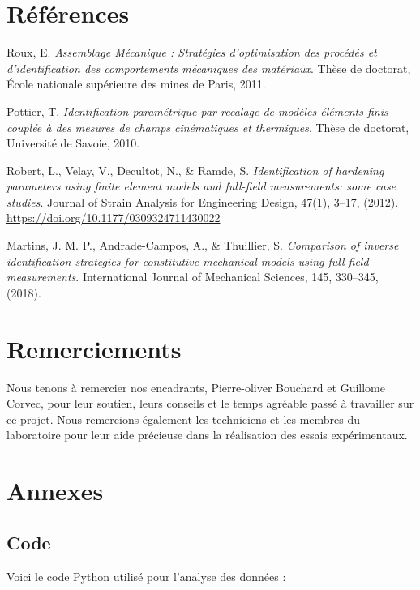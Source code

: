 \documentclass[12pt,a4paper]{article}
\begin{document}
\section{Références}
\begin{thebibliography}{9}

Roux, E. 
\textit{Assemblage Mécanique : Stratégies d’optimisation des procédés et d’identification des comportements mécaniques des matériaux}. 
Thèse de doctorat, École nationale supérieure des mines de Paris, 2011.

Pottier, T. 
\textit{Identification paramétrique par recalage de modèles éléments finis couplée à des mesures de champs cinématiques et thermiques}. 
Thèse de doctorat, Université de Savoie, 2010.

Robert, L., Velay, V., Decultot, N., \& Ramde, S. 
\textit{Identification of hardening parameters using finite element models and full-field measurements: some case studies}. 
Journal of Strain Analysis for Engineering Design, 47(1), 3–17, (2012).  
\url{https://doi.org/10.1177/0309324711430022}

Martins, J. M. P., Andrade-Campos, A., \& Thuillier, S. 
\textit{Comparison of inverse identification strategies for constitutive mechanical models using full-field measurements}. 
International Journal of Mechanical Sciences, 145, 330–345, (2018).

\end{thebibliography}


\section{Remerciements}
Nous tenons à remercier nos encadrants, Pierre-oliver Bouchard et Guillome Corvec, pour leur soutien, leurs conseils et le temps agréable passé à travailler sur ce projet. Nous remercions également les techniciens et les membres du laboratoire pour leur aide précieuse dans la réalisation des essais expérimentaux.


\newpage
\section{Annexes}

\subsection{Code}
Voici le code Python utilisé pour l'analyse des données :
\end{document}
